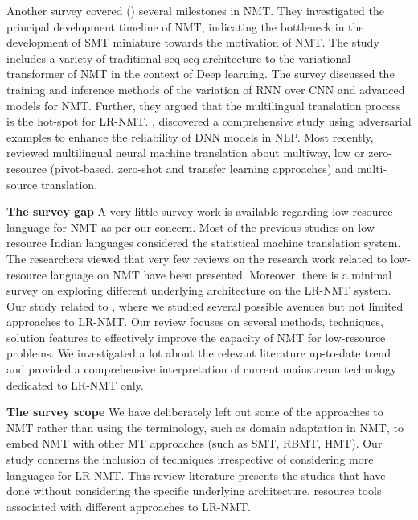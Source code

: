 \documentclass[manuscript,screen]{acmart}
\begin{document}
Another survey covered (\citet{yang2020survey}) several milestones in NMT. They investigated the principal development timeline of NMT, indicating the bottleneck in the development of SMT miniature towards the motivation of NMT. The study includes a variety of traditional seq-seq architecture to the variational transformer of NMT in the context of Deep learning. The survey discussed the training and inference methods of the variation of RNN over CNN and advanced models for NMT. Further, they argued that the multilingual translation process is the hot-spot for LR-NMT. \citet{alshemali2020improving}, discovered a comprehensive study using adversarial examples to enhance the reliability of DNN models in NLP. Most recently, \citet{dabre2019brief} reviewed multilingual neural machine translation about multiway, low or zero-resource (pivot-based, zero-shot and transfer learning approaches) and multi-source translation.

\textbf{The survey gap}
A very little survey work is available regarding low-resource language for NMT as per our concern. Most of the previous studies on low-resource Indian languages considered the statistical machine translation system. The researchers viewed that very few reviews on the research work related to low-resource language on NMT have been presented. Moreover, there is a minimal survey on exploring different underlying architecture on the LR-NMT system. Our study related to \citet{gibadullin2019survey}, where we studied several possible avenues but not limited approaches to LR-NMT. Our review focuses on several methods, techniques, solution features to effectively improve the capacity of NMT for low-resource problems. We investigated a lot about the relevant literature up-to-date trend and provided a comprehensive interpretation of current mainstream technology dedicated to LR-NMT only.

\textbf{The survey scope}
We have deliberately left out some of the approaches to NMT rather than using the terminology, such as domain adaptation in NMT, to embed NMT with other MT approaches (such as SMT, RBMT, HMT). Our study concerns the inclusion of techniques irrespective of considering more languages for LR-NMT. This review literature presents the studies that have done without considering the specific underlying architecture, resource tools associated with different approaches to LR-NMT. 
\end{document}
